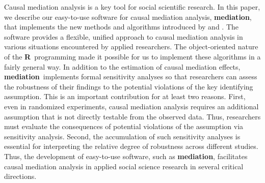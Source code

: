 \documentclass[11pt,letterpaper]{article}
\theoremstyle{plain}
\newcommand\bR{{\bf R}}
\newcommand\bmediation{{\bf mediation}}
\begin{document}
Causal mediation analysis is a key tool for social scientific
research. In this paper, we describe our easy-to-use software for
causal mediation analysis, \bmediation, that implements the new
methods and algorithms introduced by \citet*{imai:keel:yama:10} and
\citet*{imai:keel:ting:11}.  The software provides a flexible, unified
approach to causal mediation analysis in various situations
encountered by applied researchers.  The object-oriented nature of the
\bR\ programming made it possible for us to implement these algorithms
in a fairly general way.  In addition to the estimation of causal
mediation effects, \bmediation\ implements formal sensitivity analyses
so that researchers can assess the robustness of their findings to the
potential violations of the key identifying assumption.  This is an
important contribution for at least two reasons.  First, even in
randomized experiments, causal mediation analysis requires an
additional assumption that is not directly testable from the observed
data.  Thus, researchers must evaluate the consequences of potential
violations of the assumption via sensitivity analysis.  Second, the
accumulation of such sensitivity analyses is essential for
interpreting the relative degree of robustness across different
studies.  Thus, the development of easy-to-use software, such as
\bmediation, facilitates causal mediation analysis in applied social
science research in several critical directions.


\clearpage
{}

\end{document}
